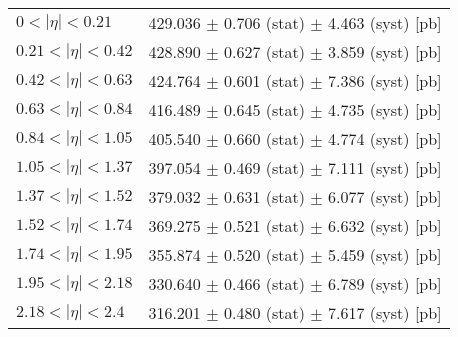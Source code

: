 \begin{tabular}{lc}
\hline
\hline
$0 < |\eta| <0.21$             & 429.036 $\pm$ 0.706 (stat) $\pm$ 4.463 (syst) [pb]  \\
$0.21 < |\eta| <0.42$          & 428.890 $\pm$ 0.627 (stat) $\pm$ 3.859 (syst) [pb]  \\
$0.42 < |\eta| <0.63$          & 424.764 $\pm$ 0.601 (stat) $\pm$ 7.386 (syst) [pb]  \\
$0.63 < |\eta| <0.84$          & 416.489 $\pm$ 0.645 (stat) $\pm$ 4.735 (syst) [pb]  \\
$0.84 < |\eta| <1.05$          & 405.540 $\pm$ 0.660 (stat) $\pm$ 4.774 (syst) [pb]  \\
$1.05 < |\eta| <1.37$          & 397.054 $\pm$ 0.469 (stat) $\pm$ 7.111 (syst) [pb]  \\
$1.37 < |\eta| <1.52$          & 379.032 $\pm$ 0.631 (stat) $\pm$ 6.077 (syst) [pb]  \\
$1.52 < |\eta| <1.74$          & 369.275 $\pm$ 0.521 (stat) $\pm$ 6.632 (syst) [pb]  \\
$1.74 < |\eta| <1.95$          & 355.874 $\pm$ 0.520 (stat) $\pm$ 5.459 (syst) [pb]  \\
$1.95 < |\eta| <2.18$          & 330.640 $\pm$ 0.466 (stat) $\pm$ 6.789 (syst) [pb]  \\
$2.18 < |\eta| <2.4$           & 316.201 $\pm$ 0.480 (stat) $\pm$ 7.617 (syst) [pb]  \\
\hline
\hline
\end{tabular}
